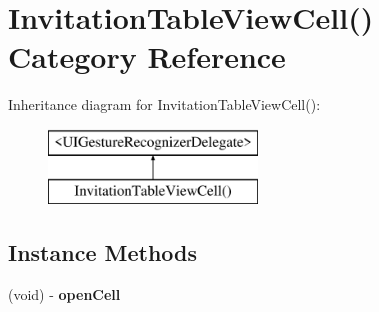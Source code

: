 \hypertarget{category_invitation_table_view_cell_07_08}{\section{Invitation\+Table\+View\+Cell() Category Reference}
\label{category_invitation_table_view_cell_07_08}
}
Inheritance diagram for Invitation\+Table\+View\+Cell()\+:\begin{figure}[H]
\begin{center}
\leavevmode
\includegraphics[height=2.000000cm]{category_invitation_table_view_cell_07_08}
\end{center}
\end{figure}
\subsection*{Instance Methods}
\begin{DoxyCompactItemize}
\item 
\hypertarget{category_invitation_table_view_cell_07_08_ac40a2482b9d30cbdeb4fa682bce71c2e}{(void) -\/ {\bfseries open\+Cell}}\label{category_invitation_table_view_cell_07_08_ac40a2482b9d30cbdeb4fa682bce71c2e}

\end{DoxyCompactItemize}
